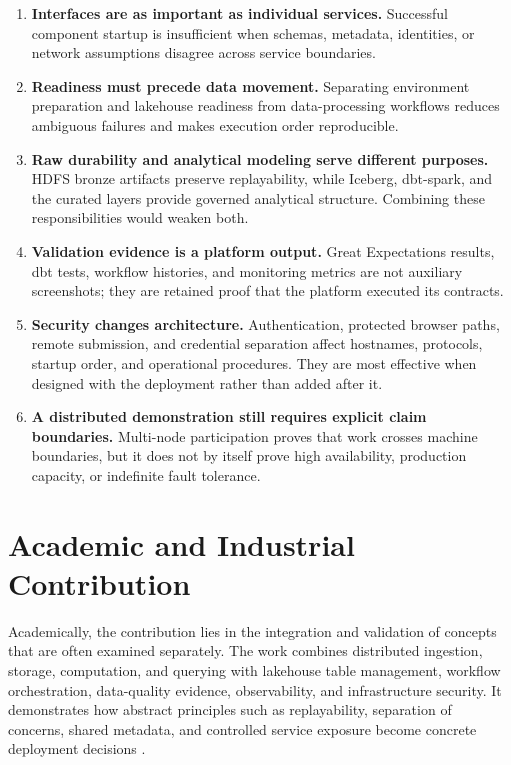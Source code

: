 \begin{enumerate}
    \item \textbf{Interfaces are as important as individual services.} Successful component startup is insufficient when schemas, metadata, identities, or network assumptions disagree across service boundaries.
    \item \textbf{Readiness must precede data movement.} Separating environment preparation and lakehouse readiness from data-processing workflows reduces ambiguous failures and makes execution order reproducible.
    \item \textbf{Raw durability and analytical modeling serve different purposes.} HDFS bronze artifacts preserve replayability, while Iceberg, dbt-spark, and the curated layers provide governed analytical structure. Combining these responsibilities would weaken both.
    \item \textbf{Validation evidence is a platform output.} Great Expectations results, dbt tests, workflow histories, and monitoring metrics are not auxiliary screenshots; they are retained proof that the platform executed its contracts.
    \item \textbf{Security changes architecture.} Authentication, protected browser paths, remote submission, and credential separation affect hostnames, protocols, startup order, and operational procedures. They are most effective when designed with the deployment rather than added after it.
    \item \textbf{A distributed demonstration still requires explicit claim boundaries.} Multi-node participation proves that work crosses machine boundaries, but it does not by itself prove high availability, production capacity, or indefinite fault tolerance.
\end{enumerate}

\section{Academic and Industrial Contribution}
Academically, the contribution lies in the integration and validation of concepts that are often examined separately. The work combines distributed ingestion, storage, computation, and querying with lakehouse table management, workflow orchestration, data-quality evidence, observability, and infrastructure security. It demonstrates how abstract principles such as replayability, separation of concerns, shared metadata, and controlled service exposure become concrete deployment decisions \cite{kleppmann2017ddia,armbrust2021lakehouse,marz2015bigdata}.

